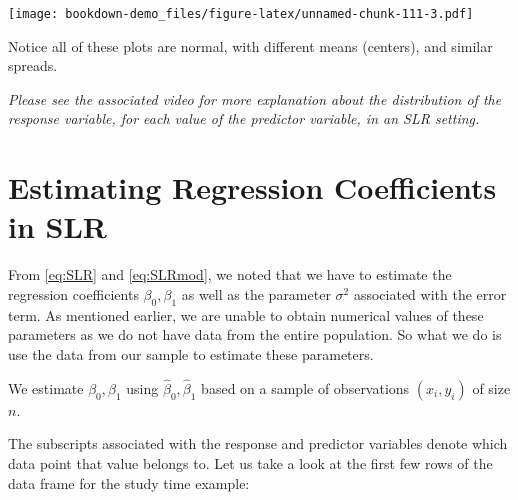 \documentclass[
]{book}
\newenvironment{Shaded}{\begin{snugshade}}{\end{snugshade}}
\newcommand{\AttributeTok}[1]{\textcolor[rgb]{0.13,0.29,0.53}{#1}}
\newcommand{\DecValTok}[1]{\textcolor[rgb]{0.00,0.00,0.81}{#1}}
\newcommand{\DocumentationTok}[1]{\textcolor[rgb]{0.56,0.35,0.01}{\textbf{\textit{#1}}}}
\newcommand{\FloatTok}[1]{\textcolor[rgb]{0.00,0.00,0.81}{#1}}
\newcommand{\FunctionTok}[1]{\textcolor[rgb]{0.13,0.29,0.53}{\textbf{#1}}}
\newcommand{\NormalTok}[1]{#1}
\newcommand{\OtherTok}[1]{\textcolor[rgb]{0.56,0.35,0.01}{#1}}
\newcommand{\SpecialCharTok}[1]{\textcolor[rgb]{0.81,0.36,0.00}{\textbf{#1}}}
\newcommand{\StringTok}[1]{\textcolor[rgb]{0.31,0.60,0.02}{#1}}
\begin{document}
\begin{Shaded}
\end{Shaded}

\texttt{[image: bookdown-demo\_files/figure-latex/unnamed-chunk-111-3.pdf]}

Notice all of these plots are normal, with different means (centers), and similar spreads.

\emph{Please see the associated video for more explanation about the distribution of the response variable, for each value of the predictor variable, in an SLR setting.}

\hypertarget{estimating-regression-coefficients-in-slr}{%
\section{Estimating Regression Coefficients in SLR}\label{estimating-regression-coefficients-in-slr}}

From \eqref{eq:SLR} and \eqref{eq:SLRmod}, we noted that we have to estimate the regression coefficients \(\beta_0, \beta_1\) as well as the parameter \(\sigma^2\) associated with the error term. As mentioned earlier, we are unable to obtain numerical values of these parameters as we do not have data from the entire population. So what we do is use the data from our sample to estimate these parameters.

We estimate \(\beta_0,\beta_1\) using \(\hat{\beta}_0,\hat{\beta}_1\) based on a sample of observations \((x_i,y_i)\) of size \(n\).

The subscripts associated with the response and predictor variables denote which data point that value belongs to. Let us take a look at the first few rows of the data frame for the study time example:
\end{document}
